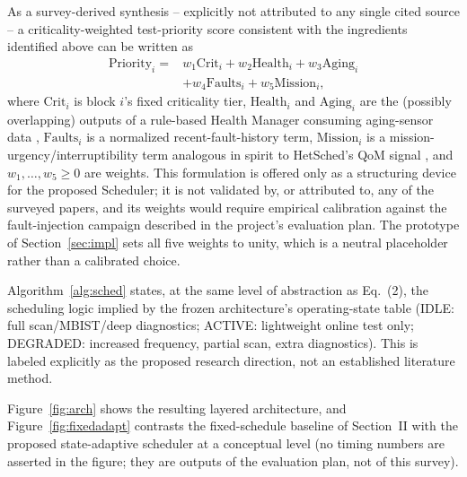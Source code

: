\documentclass[journal]{IEEEtran}
\begin{document}
As a survey-derived synthesis -- explicitly not attributed to any single cited source -- a criticality-weighted test-priority score consistent with the ingredients identified above can be written as
\begin{equation}
\begin{split}\mathrm{Priority}_i ={}& w_1\mathrm{Crit}_i + w_2\mathrm{Health}_i + w_3\mathrm{Aging}_i\\ &+ w_4\mathrm{Faults}_i + w_5\mathrm{Mission}_i,\end{split}
\end{equation}
where $\mathrm{Crit}_i$ is block $i$'s fixed criticality tier, $\mathrm{Health}_i$ and $\mathrm{Aging}_i$ are the (possibly overlapping) outputs of a rule-based Health Manager consuming aging-sensor data \cite{r4,r6}, $\mathrm{Faults}_i$ is a normalized recent-fault-history term, $\mathrm{Mission}_i$ is a mission-urgency/interruptibility term analogous in spirit to HetSched's QoM signal \cite{r18}, and $w_1,\ldots,w_5\ge0$ are weights. This formulation is offered only as a structuring device for the proposed Scheduler; it is not validated by, or attributed to, any of the surveyed papers, and its weights would require empirical calibration against the fault-injection campaign described in the project's evaluation plan. The prototype of Section~\ref{sec:impl} sets all five weights to unity, which is a neutral placeholder rather than a calibrated choice.

Algorithm~\ref{alg:sched} states, at the same level of abstraction as Eq.~(2), the scheduling logic implied by the frozen architecture's operating-state table (IDLE: full scan/MBIST/deep diagnostics; ACTIVE: lightweight online test only; DEGRADED: increased frequency, partial scan, extra diagnostics). This is labeled explicitly as the proposed research direction, not an established literature method.

Figure~\ref{fig:arch} shows the resulting layered architecture, and Figure~\ref{fig:fixedadapt} contrasts the fixed-schedule baseline of Section~II with the proposed state-adaptive scheduler at a conceptual level (no timing numbers are asserted in the figure; they are outputs of the evaluation plan, not of this survey).
\end{document}
